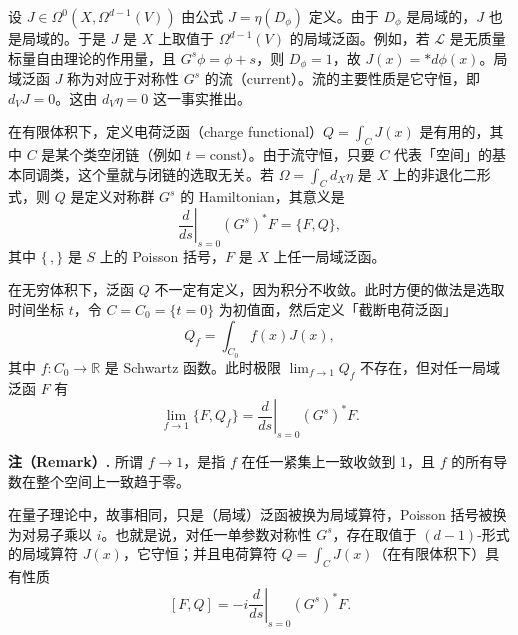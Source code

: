 设 $J\in\Omega^0(X,\Omega^{d-1}(V))$ 由公式 $J=\eta(D_\phi)$ 定义。由于 $D_\phi$ 是局域的，$J$ 也是局域的。于是 $J$ 是 $X$ 上取值于 $\Omega^{d-1}(V)$ 的局域泛函。例如，若 $\mathcal{L}$ 是无质量标量自由理论的作用量，且 $G^s\phi=\phi+s$，则 $D_\phi=1$，故 $J(x)=*d\phi(x)$。局域泛函 $J$ 称为对应于对称性 $G^s$ 的流（current）。流的主要性质是它守恒，即 $d_V J=0$。这由 $d_V\eta=0$ 这一事实推出。


在有限体积下，定义电荷泛函（charge functional）$Q=\int_C J(x)$ 是有用的，其中 $C$ 是某个类空闭链（例如 $t=\text{const}$）。由于流守恒，只要 $C$ 代表「空间」的基本同调类，这个量就与闭链的选取无关。若 $\Omega=\int_C d_X\eta$ 是 $X$ 上的非退化二形式，则 $Q$ 是定义对称群 $G^s$ 的 Hamiltonian，其意义是
\[
\left.\frac{d}{ds}\right|_{s=0}(G^s)^*F=\{F,Q\},
\]
其中 $\{\,,\}$ 是 $S$ 上的 Poisson 括号，$F$ 是 $X$ 上任一局域泛函。

在无穷体积下，泛函 $Q$ 不一定有定义，因为积分不收敛。此时方便的做法是选取时间坐标 $t$，令 $C=C_0=\{t=0\}$ 为初值面，然后定义「截断电荷泛函」
\begin{equation}
  \tag{1.18}
  \label{eq:1-18}
  Q_f=\int_{C_0}f(x)J(x),
\end{equation}
其中 $f:C_0\to\mathbb{R}$ 是 Schwartz 函数。此时极限 $\lim_{f\to1}Q_f$ 不存在，但对任一局域泛函 $F$ 有
\begin{equation}
  \tag{1.19}
  \label{eq:1-19}
  \lim_{f\to1}\{F,Q_f\}=\left.\frac{d}{ds}\right|_{s=0}(G^s)^*F.
\end{equation}

\textbf{注（Remark）.} 所谓 $f\to1$，是指 $f$ 在任一紧集上一致收敛到 1，且 $f$ 的所有导数在整个空间上一致趋于零。

在量子理论中，故事相同，只是（局域）泛函被换为局域算符，Poisson 括号被换为对易子乘以 $i$。也就是说，对任一单参数对称性 $G^s$，存在取值于 $(d-1)$-形式的局域算符 $J(x)$，它守恒；并且电荷算符 $Q=\int_C J(x)$（在有限体积下）具有性质
\begin{equation}
  \tag{1.20}
  \label{eq:1-20}
  [F,Q]=-i\left.\frac{d}{ds}\right|_{s=0}(G^s)^*F.
\end{equation}

